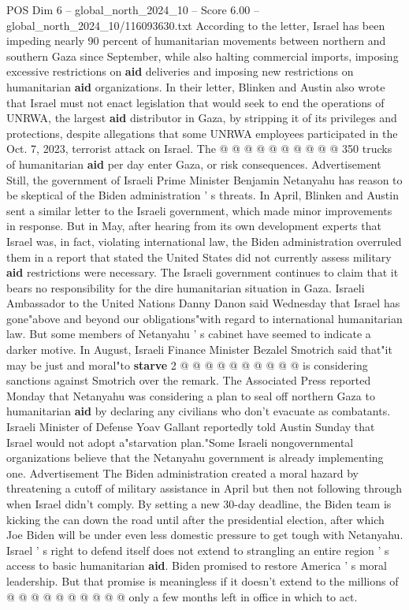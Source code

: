 \begin{textsample}{POS Dim 6 – global\_north\_2024\_10 – Score 6.00 – global\_north\_2024\_10/116093630.txt}
According to the letter, Israel has been impeding nearly 90 percent of humanitarian movements between northern and southern Gaza since September, while also halting commercial imports, imposing excessive restrictions on \textbf{aid} deliveries and imposing new restrictions on humanitarian \textbf{aid} organizations.
In their letter, Blinken and Austin also wrote that Israel must not enact legislation that would seek to end the operations of UNRWA, the largest \textbf{aid} distributor in Gaza, by stripping it of its privileges and protections, despite allegations that some UNRWA employees participated in the Oct. 7, 2023, terrorist attack on Israel.
The @ @ @ @ @ @ @ @ @ @ 350 trucks of humanitarian \textbf{aid} per day enter Gaza, or risk consequences.
Advertisement Still, the government of Israeli Prime Minister Benjamin Netanyahu has reason to be skeptical of the Biden administration ' s threats.
In April, Blinken and Austin sent a similar letter to the Israeli government, which made minor improvements in response.
But in May, after hearing from its own development experts that Israel was, in fact, violating international law, the Biden administration overruled them in a report that stated the United States did not currently assess military \textbf{aid} restrictions were necessary.
The Israeli government continues to claim that it bears no responsibility for the dire humanitarian situation in Gaza.
Israeli Ambassador to the United Nations Danny Danon said Wednesday that Israel has gone"above and beyond our obligations"with regard to international humanitarian law.
But some members of Netanyahu ' s cabinet have seemed to indicate a darker motive.
In August, Israeli Finance Minister Bezalel Smotrich said that"it may be just and moral"to \textbf{starve} 2 @ @ @ @ @ @ @ @ @ @ is considering sanctions against Smotrich over the remark.
The Associated Press reported Monday that Netanyahu was considering a plan to seal off northern Gaza to humanitarian \textbf{aid} by declaring any civilians who don't evacuate as combatants.
Israeli Minister of Defense Yoav Gallant reportedly told Austin Sunday that Israel would not adopt a"starvation plan."Some Israeli nongovernmental organizations believe that the Netanyahu government is already implementing one.
Advertisement The Biden administration created a moral hazard by threatening a cutoff of military assistance in April but then not following through when Israel didn't comply.
By setting a new 30-day deadline, the Biden team is kicking the can down the road until after the presidential election, after which Joe Biden will be under even less domestic pressure to get tough with Netanyahu.
Israel ' s right to defend itself does not extend to strangling an entire region ' s access to basic humanitarian \textbf{aid}.
Biden promised to restore America ' s moral leadership.
But that promise is meaningless if it doesn't extend to the millions of @ @ @ @ @ @ @ @ @ @ only a few months left in office in which to act.

\end{textsample}
